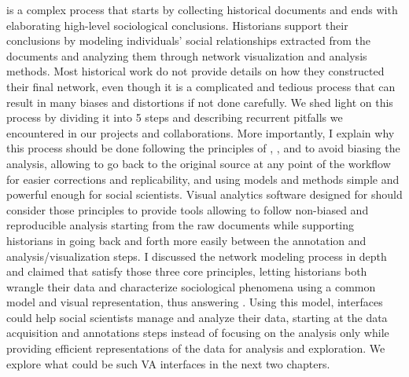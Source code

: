 \hsna is a complex process that starts by collecting historical documents and ends with elaborating high-level sociological conclusions.
Historians support their conclusions by modeling individuals' social relationships extracted from the documents and analyzing them through network visualization and analysis methods.
Most historical work do not provide details on how they constructed their final network, even though it is a complicated and tedious process that can result in many biases and distortions if not done carefully\cite{alkadi2022}.
We shed light on this process by dividing it into 5 steps and describing recurrent pitfalls we encountered in our projects and collaborations.
More importantly, I explain why this process should be done following the principles of \traceability, \reality, and \simplicity to avoid biasing the analysis, allowing to go back to the original source at any point of the workflow for easier corrections and replicability, and using models and methods simple and powerful enough for social scientists.
Visual analytics software designed for \hsna should consider those principles to provide tools allowing to follow non-biased and reproducible analysis starting from the raw documents while supporting historians in going back and forth more easily between the annotation and analysis/visualization steps.
I discussed the network modeling process in depth and claimed that \modelplural satisfy those three core principles, letting historians both wrangle their data and characterize sociological phenomena using a common model and visual representation, thus answering \qone.
Using this model, \va interfaces could help social scientists manage and analyze their data, starting at the data acquisition and annotations steps instead of focusing on the analysis only while providing efficient representations of the data for analysis and exploration.
We explore what could be such VA interfaces in the next two chapters.
